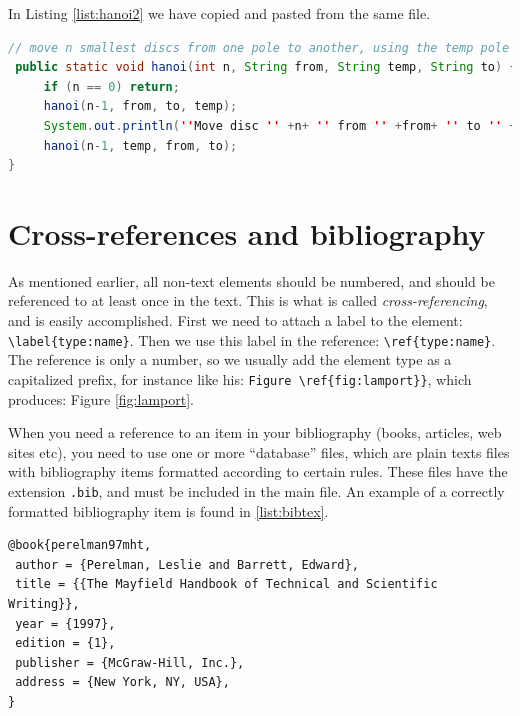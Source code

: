 %


In Listing \ref{list:hanoi2} we have copied and pasted from the same file.

\begin{lstlisting}[caption=Core of the recursive solution of Towers in Hanoi,label=list:hanoi2,  language=Java,float=htpb]
// move n smallest discs from one pole to another, using the temp pole
 public static void hanoi(int n, String from, String temp, String to) {
     if (n == 0) return;
     hanoi(n-1, from, to, temp);
     System.out.println(''Move disc '' +n+ '' from '' +from+ '' to '' +to);
     hanoi(n-1, temp, from, to);
}
\end{lstlisting}

\section{Cross-references and bibliography}

As mentioned earlier, all non-text elements should be numbered, and should be referenced to at least once in the text.
This is what is called {\em cross-referencing}, and is easily accomplished.
First we need to attach a label to the element: \verb|\label{type:name}|. Then we use this label in the reference: \verb|\ref{type:name}|. The reference is only a number, so we usually add the element type as a capitalized prefix, for instance like his: \verb|Figure \ref{fig:lamport}}|, which produces: Figure \ref{fig:lamport}.

When you need a reference to an item in your bibliography (books, articles, web sites etc), you need to use one or more ``database'' files, which are plain texts files with bibliography items formatted according to certain rules. These files have the extension {\tt .bib}, and must be included in the main file.
An example of a correctly formatted bibliography item is found in \ref{list:bibtex}.

\begin{lstlisting}[caption=BibTex entry,label=list:bibtex,language=Tex,float=!h]
 @book{perelman97mht,
 author = {Perelman, Leslie and Barrett, Edward},
 title = {{The Mayfield Handbook of Technical and Scientific Writing}},
 year = {1997},
 edition = {1},
 publisher = {McGraw-Hill, Inc.},
 address = {New York, NY, USA},
} 
\end{lstlisting} 

